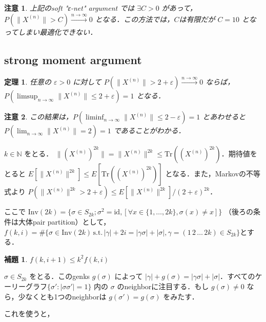 \documentclass{ltjsarticle}
\makeatletter
\theoremstyle{mystyle1}
\newtheorem{thm}[dfn]{定理}
\newtheorem{lem}[dfn]{補題}
\theoremstyle{mystyle2}
\newtheorem{note*}{注意}
\theoremstyle{mystyle3}
\renewenvironment{proof}[1][\proofname]{\par
  \pushQED{\qed}%
  \normalfont
  \topsep6\p@\@plus6\p@ \trivlist
  \item[\hskip\labelsep{\bfseries\sffamily #1}]\ignorespaces
}{%
  \popQED\endtrivlist\@endpefalse
}
\renewcommand\proofname{証明}
\makeatother
\begin{document}
\begin{note*}
    上記のsoft "ε-net" argument では $\exists C> 0$ があって， $P(\|X^{(n)}\|>C)\overset{n\to\infty}{\longrightarrow} 0$ となる．この方法では，$C$は有限だが $C=10$ となってしまい最適化できない．
\end{note*}

\subsection{strong moment argument}

\begin{thm}
    任意の $\varepsilon>0$ に対して $P(\|X^{(n)}\|> 2+\varepsilon)\overset{n\to\infty}{\longrightarrow}0$ ならば， $P(\limsup_{n\to\infty}\|X^{(n)}\|\leq 2+\varepsilon)=1$ となる．
\end{thm}

\begin{note*}
    この結果は，$P(\liminf_{n\to\infty}\|X^{(n)}\|\leq 2-\varepsilon)=1$ とあわせると $P(\lim_{n\to\infty}\|X^{(n)}\|=2)=1$ であることがわかる．
\end{note*}

$k\in\mathbb{N}$ をとる． $\|(X^{(n)})^{2k}\|=\|X^{(n)}\|^{2k}\leq\mathrm{Tr}((X^{(n)})^{2k})$．期待値をとると $E[\|X^{(n)}\|^{2k}]\leq E[\mathrm{Tr}((X^{(n)})^{2k})]$ となる．また，Markovの不等式より
$P(\|X^{(n)}\|^{2k}>2+\varepsilon)\leq E[\|X^{(n)}\|^{2k}]/(2+\varepsilon)^{2k}$．

ここで $\mathrm{Inv}(2k)=\{\sigma\in S_{2k};\sigma^2=\mathrm{id},[\forall x\in\{1,\ldots,2k\},\sigma(x)\neq x]\}$ （後ろの条件は大体pair partition）として， $f(k,i)=\#\{\sigma\in\mathrm{Inv}(2k)\,\mathrm{s.t.}\,|\gamma|+2i=|\gamma\sigma|+|\sigma|,\gamma=(1\,2\,\ldots\,2k)\in S_{2k}\}$とする．

\begin{lem}
    $f(k,i+1)\leq k^2f(k,i)$
\end{lem}

\begin{proof}
    $\sigma\in S_{2k}$ をとる．このgenks $g(\sigma)$ によって $|\gamma|+g(\sigma)=|\gamma\sigma|+|\sigma|$．すべてのケーリーグラフ$\{\sigma':|\sigma\sigma'|=1\}$ 内の $\sigma$ のneighborに注目する．もし $g(\sigma)\neq 0$ なら，少なくとも1つのneighborは $g(\sigma')=g(\sigma)$ をみたす．
\end{proof}

これを使うと，
\end{document}
